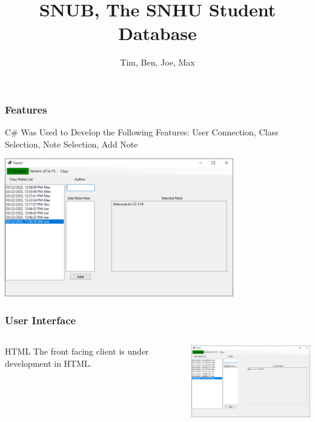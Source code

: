 \documentclass[aspectratio=169]{beamer}
\title{SNUB, The SNHU Student Database}
\author{Tim, Ben, Joe, Max}
\institute{SNHU CS-114}
\begin{document}
\frame{\titlepage} %

\begin{frame}
    \frametitle{Features}

    \begin{block}{\centering C\# Was Used to Develop the Following Features:}
        \centering User Connection, Class Selection, Note Selection, Add Note
    \end{block}

    \centering \includegraphics[height=6cm]{Sample_of_Features.PNG}
\end{frame}

\begin{frame}
    \frametitle{User Interface}

    \begin{columns}
        \begin{column}{0.48\textwidth}
            \begin{block}{HTML}
                The front facing client is under development in HTML.
            \end{block}
        \end{column}
        \begin{column}{0.48\textwidth}
            \includegraphics[width=7cm]{Sample_of_Features}
        \end{column}
    \end{columns}

\end{frame}
\end{document}
